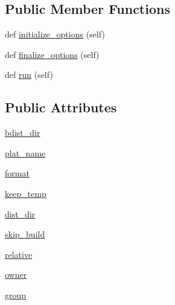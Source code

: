 \subsection*{Public Member Functions}
\begin{DoxyCompactItemize}
\item 
def \hyperlink{classsetuptools_1_1__distutils_1_1command_1_1bdist__dumb_1_1bdist__dumb_afaa688911bdfd2fcaff9e148acf241a1}{initialize\+\_\+options} (self)
\item 
def \hyperlink{classsetuptools_1_1__distutils_1_1command_1_1bdist__dumb_1_1bdist__dumb_a14d8271f229e7d953b3f9e2c80064e2b}{finalize\+\_\+options} (self)
\item 
def \hyperlink{classsetuptools_1_1__distutils_1_1command_1_1bdist__dumb_1_1bdist__dumb_a2c9f36cb7482612d496d19c2e41b9bec}{run} (self)
\end{DoxyCompactItemize}
\subsection*{Public Attributes}
\begin{DoxyCompactItemize}
\item 
\hyperlink{classsetuptools_1_1__distutils_1_1command_1_1bdist__dumb_1_1bdist__dumb_af75a7fdb7ff7f19793fcd3f6d01a5c43}{bdist\+\_\+dir}
\item 
\hyperlink{classsetuptools_1_1__distutils_1_1command_1_1bdist__dumb_1_1bdist__dumb_a7ddff3f6170cad1f2cf030c5d9188d44}{plat\+\_\+name}
\item 
\hyperlink{classsetuptools_1_1__distutils_1_1command_1_1bdist__dumb_1_1bdist__dumb_a885f482ed7bc6694184627b710182072}{format}
\item 
\hyperlink{classsetuptools_1_1__distutils_1_1command_1_1bdist__dumb_1_1bdist__dumb_ac8bbe217e422f269e70a0270e83b1d16}{keep\+\_\+temp}
\item 
\hyperlink{classsetuptools_1_1__distutils_1_1command_1_1bdist__dumb_1_1bdist__dumb_a72a0e764620fb9f152d2171fde75ffc4}{dist\+\_\+dir}
\item 
\hyperlink{classsetuptools_1_1__distutils_1_1command_1_1bdist__dumb_1_1bdist__dumb_ad110a92455344f68c58d74f80c64b5fe}{skip\+\_\+build}
\item 
\hyperlink{classsetuptools_1_1__distutils_1_1command_1_1bdist__dumb_1_1bdist__dumb_a67762188a84f9412070399a6655015ee}{relative}
\item 
\hyperlink{classsetuptools_1_1__distutils_1_1command_1_1bdist__dumb_1_1bdist__dumb_a0f4446d4331b9621cb6b7394d4995941}{owner}
\item 
\hyperlink{classsetuptools_1_1__distutils_1_1command_1_1bdist__dumb_1_1bdist__dumb_af6b32c80b7efa05ab3af3779b4494786}{group}
\end{DoxyCompactItemize}
